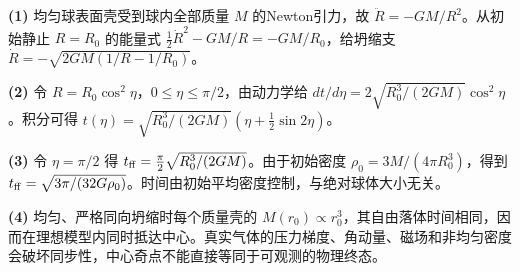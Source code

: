 \par\noindent\textbf{(1)} 均匀球表面壳受到球内全部质量 \(M\) 的Newton引力，故 \(\ddot R=-GM/R^2\)。从初始静止 \(R=R_0\) 的能量式 \(\tfrac12\dot R^2-GM/R=-GM/R_0\)，给坍缩支 \(\dot R=-\sqrt{2GM(1/R-1/R_0)}\)。
\par\noindent\textbf{(2)} 令 \(R=R_0\cos^2\eta\)，\(0\le\eta\le\pi/2\)，由动力学给 \(dt/d\eta=2\sqrt{R_0^3/(2GM)}\cos^2\eta\)。积分可得 \(t(\eta)=\sqrt{R_0^3/(2GM)}(\eta+\tfrac12\sin2\eta)\)。
\par\noindent\textbf{(3)} 令 \(\eta=\pi/2\) 得 \(t_{\rm ff}=\frac\pi2\sqrt{R_0^3/(2GM)}\)。由于初始密度 \(\rho_0=3M/(4\pi R_0^3)\)，得到 \(t_{\rm ff}=\sqrt{3\pi/(32G\rho_0)}\)。时间由初始平均密度控制，与绝对球体大小无关。
\par\noindent\textbf{(4)} 均匀、严格同向坍缩时每个质量壳的 \(M(r_0)\propto r_0^3\)，其自由落体时间相同，因而在理想模型内同时抵达中心。真实气体的压力梯度、角动量、磁场和非均匀密度会破坏同步性，中心奇点不能直接等同于可观测的物理终态。
